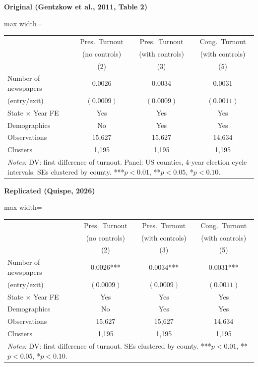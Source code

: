 \documentclass[11pt,a4paper]{article}
\begin{document}
\vspace{0.5cm}
\begin{minipage}[t]{0.48\textwidth}
\centering
\textbf{\large Original (Gentzkow et al., 2011, Table 2)}
\vspace{0.3cm}

\begin{adjustbox}{max width=\textwidth}
\begin{tabular}{lccc}
\toprule
 & Pres.\ Turnout & Pres.\ Turnout & Cong.\ Turnout \\
 & (no controls) & (with controls) & (with controls) \\
 & (2) & (3) & (5) \\
\midrule
Number of newspapers & 0.0026 & 0.0034 & 0.0031 \\
(entry/exit) & $(0.0009)$ & $(0.0009)$ & $(0.0011)$ \\[0.3em]
\midrule
State $\times$ Year FE & Yes & Yes & Yes \\
Demographics & No & Yes & Yes \\
Observations & 15,627 & 15,627 & 14,634 \\
Clusters & 1,195 & 1,195 & 1,195 \\
\bottomrule
\multicolumn{4}{p{0.95\textwidth}}{\footnotesize\textit{Notes:} DV: first difference of turnout. Panel: US counties, 4-year election cycle intervals. SEs clustered by county. ***$p<0.01$, **$p<0.05$, *$p<0.10$.}
\end{tabular}
\end{adjustbox}
\end{minipage}%
\hfill
\begin{minipage}[t]{0.48\textwidth}
\centering
\textbf{\large Replicated (Quispe, 2026)}
\vspace{0.3cm}

\begin{adjustbox}{max width=\textwidth}
\begin{tabular}{lccc}
\toprule
 & Pres.\ Turnout & Pres.\ Turnout & Cong.\ Turnout \\
 & (no controls) & (with controls) & (with controls) \\
 & (2) & (3) & (5) \\
\midrule
Number of newspapers & 0.0026*** & 0.0034*** & 0.0031*** \\
(entry/exit) & $(0.0009)$ & $(0.0009)$ & $(0.0011)$ \\[0.3em]
\midrule
State $\times$ Year FE & Yes & Yes & Yes \\
Demographics & No & Yes & Yes \\
Observations & 15,627 & 15,627 & 14,634 \\
Clusters & 1,195 & 1,195 & 1,195 \\
\bottomrule
\multicolumn{4}{p{0.95\textwidth}}{\footnotesize\textit{Notes:} DV: first difference of turnout. SEs clustered by county. ***$p<0.01$, **$p<0.05$, *$p<0.10$.}
\end{tabular}
\end{adjustbox}
\end{minipage}
\end{document}
